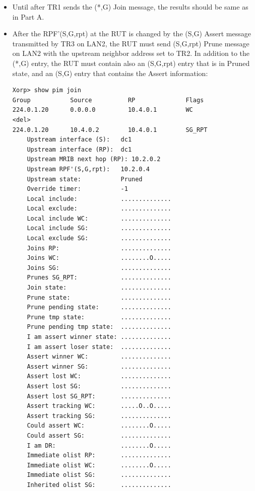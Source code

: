 \documentclass[11pt]{report}
\begin{document}

\begin{itemize}

  \item Until after TR1 sends the (*,G) Join message, the results should be
  same as in Part A.

  \item After the RPF'(S,G,rpt) at the RUT is changed by the (S,G) Assert
  message transmitted by TR3 on LAN2, the RUT must send
  (S,G,rpt) Prune message on LAN2 with the upstream neighbor address set to
  TR2. In addition to the (*,G) entry, the RUT must contain also an (S,G,rpt)
  entry that is in Pruned state, and an (S,G) entry that contains the Assert
  information:

\begin{verbatim}
Xorp> show pim join 
Group           Source          RP              Flags
224.0.1.20      0.0.0.0         10.4.0.1        WC   
<del>
224.0.1.20      10.4.0.2        10.4.0.1        SG_RPT 
    Upstream interface (S):   dc1
    Upstream interface (RP):  dc1
    Upstream MRIB next hop (RP): 10.2.0.2
    Upstream RPF'(S,G,rpt):   10.2.0.4
    Upstream state:           Pruned 
    Override timer:           -1
    Local include:            ..............
    Local exclude:            ..............
    Local include WC:         ..............
    Local include SG:         ..............
    Local exclude SG:         ..............
    Joins RP:                 ..............
    Joins WC:                 ........O.....
    Joins SG:                 ..............
    Prunes SG_RPT:            ..............
    Join state:               ..............
    Prune state:              ..............
    Prune pending state:      ..............
    Prune tmp state:          ..............
    Prune pending tmp state:  ..............
    I am assert winner state: ..............
    I am assert loser state:  ..............
    Assert winner WC:         ..............
    Assert winner SG:         ..............
    Assert lost WC:           ..............
    Assert lost SG:           ..............
    Assert lost SG_RPT:       ..............
    Assert tracking WC:       .....O..O.....
    Assert tracking SG:       ..............
    Could assert WC:          ........O.....
    Could assert SG:          ..............
    I am DR:                  ........O.....
    Immediate olist RP:       ..............
    Immediate olist WC:       ........O.....
    Immediate olist SG:       ..............
    Inherited olist SG:       ..............

\end{verbatim}
\end{itemize}
\end{document}
